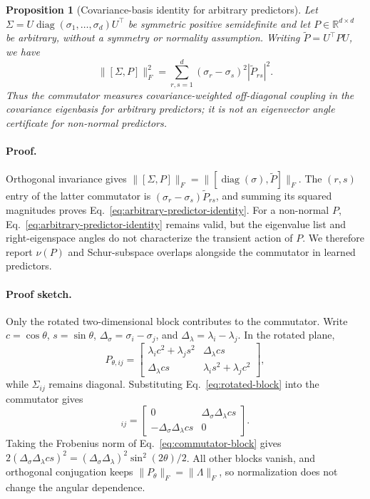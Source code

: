 \documentclass{article}
\newtheorem{proposition}{Proposition}
\newcommand{\comm}[2]{[#1,#2]}
\newcommand{\R}{\mathbb{R}}
\begin{document}
\begin{proposition}[Covariance-basis identity for arbitrary predictors]
\label{prop:arbitrary-predictor-commutator}
Let $\Sigma=U\operatorname{diag}(\sigma_1,\ldots,\sigma_d)U^\top$
be symmetric positive semidefinite and let $P\in\R^{d\times d}$ be arbitrary,
without a symmetry or normality assumption. Writing
$\widetilde P=U^\top P U$, we have
\begin{equation}
\label{eq:arbitrary-predictor-identity}
\|[\Sigma,P]\|_F^2
=\sum_{r,s=1}^d(\sigma_r-\sigma_s)^2
\left|\widetilde P_{rs}\right|^2.
\end{equation}
Thus the commutator measures covariance-weighted off-diagonal coupling in
the covariance eigenbasis for arbitrary predictors; it is not an eigenvector
angle certificate for non-normal predictors.
\end{proposition}

\paragraph{Proof.}
Orthogonal invariance gives
$\|[\Sigma,P]\|_F=\|[\operatorname{diag}(\sigma),\widetilde P]\|_F$.
The $(r,s)$ entry of the latter commutator is
$(\sigma_r-\sigma_s)\widetilde P_{rs}$, and summing its squared magnitudes
proves Eq.~\eqref{eq:arbitrary-predictor-identity}. For a non-normal $P$,
Eq.~\eqref{eq:arbitrary-predictor-identity} remains valid, but the eigenvalue
list and right-eigenspace angles do not characterize the transient action of
$P$. We therefore report $\nu(P)$ and Schur-subspace overlaps alongside the
commutator in learned predictors.

\paragraph{Proof sketch.}
Only the rotated two-dimensional block contributes to the commutator. Write $c=\cos\theta$, $s=\sin\theta$, $\Delta_\sigma=\sigma_i-\sigma_j$, and $\Delta_\lambda=\lambda_i-\lambda_j$. In the rotated plane,
\begin{equation}
P_{\theta,ij}=
\begin{bmatrix}
\lambda_i c^2+\lambda_j s^2 & \Delta_\lambda cs\\
\Delta_\lambda cs & \lambda_i s^2+\lambda_j c^2
\end{bmatrix},
\label{eq:rotated-block}
\end{equation}
while $\Sigma_{ij}$ remains diagonal. Substituting Eq.~\eqref{eq:rotated-block} into the commutator gives
\begin{equation}
\comm{\Sigma}{P_\theta}_{ij}=
\begin{bmatrix}
0 & \Delta_\sigma\Delta_\lambda cs\\
-\Delta_\sigma\Delta_\lambda cs & 0
\end{bmatrix}.
\label{eq:commutator-block}
\end{equation}
Taking the Frobenius norm of Eq.~\eqref{eq:commutator-block} gives $2(\Delta_\sigma\Delta_\lambda cs)^2=(\Delta_\sigma\Delta_\lambda)^2\sin^2(2\theta)/2$. All other blocks vanish, and orthogonal conjugation keeps $\|P_\theta\|_F=\|\Lambda\|_F$, so normalization does not change the angular dependence.
\end{document}
